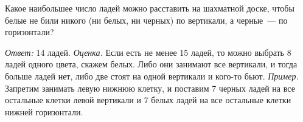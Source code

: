 \problem
Какое наибольшее число ладей можно расставить на шахматной доске, чтобы белые
не били никого (ни белых, ни черных) по вертикали, а черные~--- по горизонтали?

\solution
\emph{Ответ:} 14 ладей.
\emph{Оценка.}
Если есть не менее 15 ладей, то можно выбрать 8 ладей одного цвета, скажем
белых.
Либо они занимают все вертикали, и тогда больше ладей нет, либо две стоят на
одной вертикали и кого-то бьют.
\emph{Пример.}
Запретим занимать левую нижнюю клетку, и поставим 7 черных ладей на все
остальные клетки левой вертикали и 7 белых ладей на все остальные клетки нижней
горизонтали.

\endproblem
